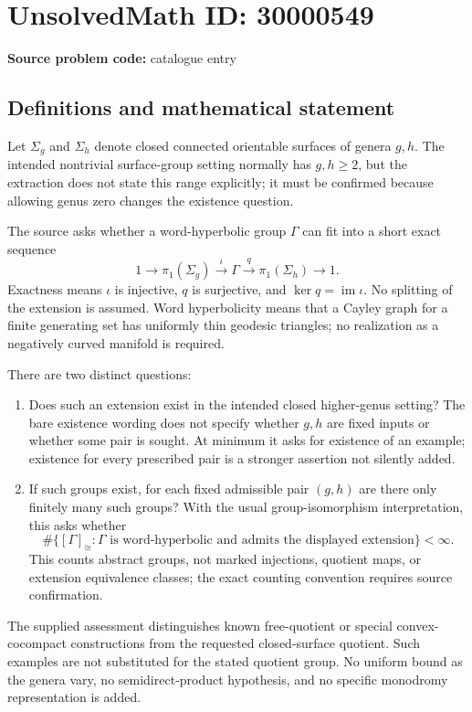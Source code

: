 \documentclass[11pt]{article}
\begin{document}
\section*{UnsolvedMath ID: 30000549}
\textbf{Source problem code:} catalogue entry
\subsection{Definitions and mathematical statement}
Let $\Sigma_g$ and $\Sigma_h$ denote closed connected orientable surfaces of genera $g,h$. The intended nontrivial surface-group setting normally has $g,h\ge2$, but the extraction does not state this range explicitly; it must be confirmed because allowing genus zero changes the existence question.

The source asks whether a word-hyperbolic group $\Gamma$ can fit into a short exact sequence
\[
 1\longrightarrow\pi_1(\Sigma_g)
   \xrightarrow{\iota}\Gamma
   \xrightarrow{q}\pi_1(\Sigma_h)
   \longrightarrow1.
\]
Exactness means $\iota$ is injective, $q$ is surjective, and $\ker q=\operatorname{im}\iota$. No splitting of the extension is assumed. Word hyperbolicity means that a Cayley graph for a finite generating set has uniformly thin geodesic triangles; no realization as a negatively curved manifold is required.

There are two distinct questions:
\begin{enumerate}
\item Does such an extension exist in the intended closed higher-genus setting? The bare existence wording does not specify whether $g,h$ are fixed inputs or whether some pair is sought. At minimum it asks for existence of an example; existence for every prescribed pair is a stronger assertion not silently added.
\item If such groups exist, for each fixed admissible pair $(g,h)$ are there only finitely many such groups? With the usual group-isomorphism interpretation, this asks whether
\[
 \#\{[\Gamma]_{\cong}:\Gamma\text{ is word-hyperbolic and admits the displayed extension}\}<\infty.
\]
This counts abstract groups, not marked injections, quotient maps, or extension equivalence classes; the exact counting convention requires source confirmation.
\end{enumerate}

The supplied assessment distinguishes known free-quotient or special convex-cocompact constructions from the requested closed-surface quotient. Such examples are not substituted for the stated quotient group. No uniform bound as the genera vary, no semidirect-product hypothesis, and no specific monodromy representation is added.
\end{document}
